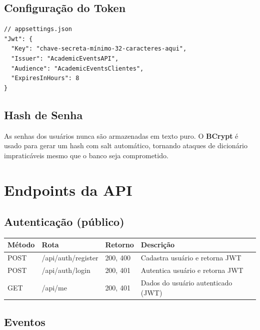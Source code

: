\documentclass[11pt, a4paper, oneside]{article}
\begin{document}
\subsection{Configuração do Token}

\begin{lstlisting}[language={[Sharp]C}]
// appsettings.json
"Jwt": {
  "Key": "chave-secreta-mínimo-32-caracteres-aqui",
  "Issuer": "AcademicEventsAPI",
  "Audience": "AcademicEventsClientes",
  "ExpiresInHours": 8
}
\end{lstlisting}

\subsection{Hash de Senha}

As senhas dos usuários nunca são armazenadas em texto puro. O \textbf{BCrypt} é usado para gerar um hash com salt automático, tornando ataques de dicionário impraticáveis mesmo que o banco seja comprometido.

\section{Endpoints da API}

\subsection{Autenticação (público)}

\begin{longtable}{L{1.5cm} L{4cm} L{3.5cm} L{5.5cm}}
\toprule
{}
\color{white}\textbf{Método} & \color{white}\textbf{Rota} & \color{white}\textbf{Retorno} & \color{white}\textbf{Descrição} \\
\midrule
\endhead
POST & /api/auth/register & 200, 400 & Cadastra usuário e retorna JWT \\
POST & /api/auth/login & 200, 401 & Autentica usuário e retorna JWT \\
GET & /api/me & 200, 401 & Dados do usuário autenticado (JWT) \\
\bottomrule
\end{longtable}

\subsection{Eventos}
\end{document}
